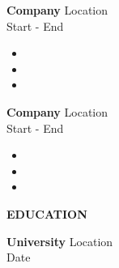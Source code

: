 \documentclass[10pt]{article}
\newcommand{\verticalspace}{\vspace{2.0mm}}
\newcommand{\heading}{\noindent\Large\bf} %
\newcommand{\headingspace}{\vspace{3.5mm}}
\begin{document}
\verticalspace

{\bf Company} \hfill Location \\
 \hfill Start - End
\begin{itemize}
\item 
\item 
\item
\end{itemize}

\verticalspace

{\bf Company} \hfill Location \\
 \hfill Start - End
\begin{itemize}
\item 
\item 
\item
\end{itemize}

\headingspace
{\heading EDUCATION}

\verticalspace

{\bf University} \hfill Location \\
 \hfill Date
\end{document}
